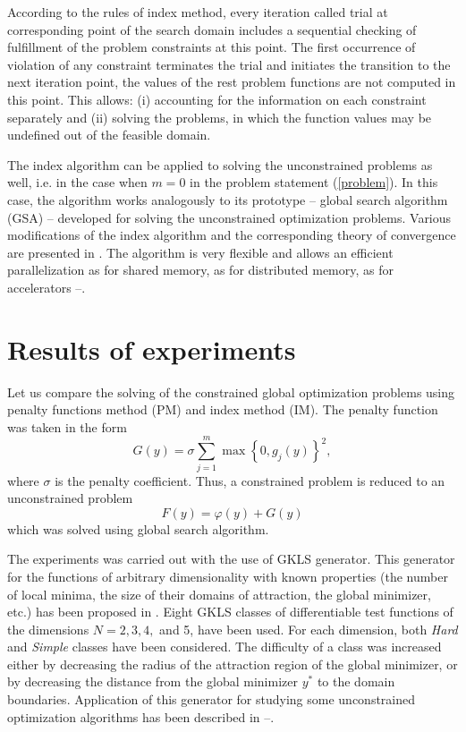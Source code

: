 \documentclass{llncs}
\begin{document}
According to the rules of index method, every iteration called trial at corresponding point of the search domain includes a sequential checking of fulfillment of the problem constraints at this point. The first occurrence of violation of any constraint terminates the trial and initiates the transition to the next iteration point, the values of the rest problem functions are not computed in this point. This allows: (i) accounting for the information on each constraint separately and (ii) solving the problems, in which the function values may be undefined out of the feasible domain.

The index algorithm can be applied to solving the unconstrained problems as well, i.e. in the case when $m = 0$ in the problem statement (\ref{problem}). In this case, the algorithm works analogously to its prototype -- global search algorithm (GSA) -- developed for solving the unconstrained optimization problems. Various modifications of the index algorithm and the corresponding theory of convergence are presented in \cite{Strongin2000}. The algorithm is very flexible and allows an efficient parallelization as for shared memory, as for distributed memory, as for accelerators \cite{Barkalov2010}--\cite{Lebedev2016}.

\section{Results of experiments}

Let us compare the solving of the constrained global optimization problems using penalty functions method (PM) and index method (IM). The penalty function was taken in the form 
\[
G(y) = \sigma \sum_{j=1}^m\max\left\{0,g_j(y)\right\}^2,
\]
where $\sigma$ is the penalty coefficient. Thus, a constrained problem is reduced to an unconstrained problem
\[
F(y)=\varphi(y)+G(y)
\]
which was solved using global search algorithm.

The experiments was carried out with the use of GKLS generator.  This generator for the functions of arbitrary dimensionality with known properties (the number of local minima, the size of their domains of attraction, the global minimizer, etc.) has been proposed in \cite{Gaviano}. Eight GKLS classes of differentiable test functions of the dimensions $N = 2, 3, 4,$ and 5, have been used. For each dimension, both \textit{Hard} and \textit{Simple} classes have been considered. The difficulty of a class was increased either by decreasing the radius of the attraction region of the global minimizer, or by decreasing the distance from the global minimizer $y^\ast$ to the domain boundaries. Application of this generator for studying some unconstrained optimization algorithms has been described in \cite{Kvasov2006}--\cite{SergeyevKvasov2015}. 
\end{document}
